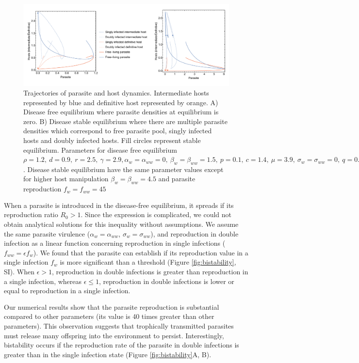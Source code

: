 \documentclass[11pt]{article}
\begin{document}
\begin{figure}[!ht]
\includegraphics[width=\textwidth]{Figures/ecotraject_nonlinear.pdf}
\caption{Trajectories of parasite and host dynamics. Intermediate hosts represented by blue and definitive host represented by orange. A) Disease free equilibrium where parasite densities at equilibrium is zero. B) Disease stable equilibrium where there are multiple parasite densities which correspond to free parasite pool, singly infected hosts and doubly infected hosts. Fill circles represent stable equilibrium. Parameters for disease free equilibrium $\rho =  1.2, \ d = 0.9, \  r = 2.5, \ \gamma =  2.9, \alpha_w = \alpha_{ww} =  0, \ \beta_w = \beta_{ww} = 1.5, \ p = 0.1, \  c = 1.4, \ \mu = 3.9, \ \sigma_w = \sigma_{ww} = 0, \ q = 0.01, \ f_w = f_{ww} = 7.5, \ \delta = 0.9, \ k = 0.26$. Disease stable equilibrium have the same parameter values except for higher host manipulation $ \beta_w =  \beta_{ww} = 4.5$ and parasite reproduction $ f_w  = f_{ww} = 45$}
\label{fig:ecotraject:nonlinear}
\end{figure}

When a parasite is introduced in the disease-free equilibrium, it spreads if its reproduction ratio $R_0 > 1$. 
Since the expression is complicated, we could not obtain analytical solutions for this inequality without assumptions. 
We assume the same parasite virulence ($\alpha_w = \alpha_{ww}$, $\sigma_w = \sigma_{ww}$), and reproduction in double infection as a linear function concerning reproduction in single infections ($f_{ww} = \epsilon f_w$).
We found that the parasite can establish if its reproduction value in a single infection $f_w$ is more significant than a threshold (Figure \ref{fig:bistability}, SI). 
When $\epsilon > 1$, reproduction in double infections is greater than reproduction in a single infection, whereas $\epsilon \leq 1$, reproduction in double infections is lower or equal to reproduction in a single infection.
 
Our numerical results show that the parasite reproduction is substantial compared to other parameters (its value is 40 times greater than other parameters).
This observation suggests that trophically transmitted parasites must release many offspring into the environment to persist. 
Interestingly, bistability occurs if the reproduction rate of the parasite in double infections is greater than in the single infection state (Figure \ref{fig:bistability}A, B). 
\end{document}

